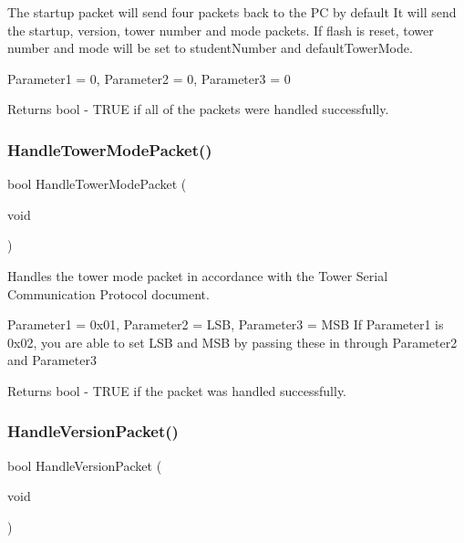 The startup packet will send four packets back to the PC by default It will send the startup, version, tower number and mode packets. If flash is reset, tower number and mode will be set to student\+Number and default\+Tower\+Mode. 

Parameter1 = 0, Parameter2 = 0, Parameter3 = 0

\begin{DoxyReturn}{Returns}
bool -\/ T\+R\+UE if all of the packets were handled successfully. 
\end{DoxyReturn}
\mbox{\label{group__main__module_gae491978a09b1e90673364b69746bcae1}} 
\subsubsection{\texorpdfstring{Handle\+Tower\+Mode\+Packet()}{HandleTowerModePacket()}}
{\footnotesize\ttfamily bool Handle\+Tower\+Mode\+Packet (\begin{DoxyParamCaption}\item[{void}]{ }\end{DoxyParamCaption})}



Handles the tower mode packet in accordance with the Tower Serial Communication Protocol document. 

Parameter1 = 0x01, Parameter2 = L\+SB, Parameter3 = M\+SB If Parameter1 is 0x02, you are able to set L\+SB and M\+SB by passing these in through Parameter2 and Parameter3

\begin{DoxyReturn}{Returns}
bool -\/ T\+R\+UE if the packet was handled successfully. 
\end{DoxyReturn}
\mbox{\label{group__main__module_ga84fe5ea768aedc0d1e4e2818ff8bd406}} 
\subsubsection{\texorpdfstring{Handle\+Version\+Packet()}{HandleVersionPacket()}}
{\footnotesize\ttfamily bool Handle\+Version\+Packet (\begin{DoxyParamCaption}\item[{void}]{ }\end{DoxyParamCaption})}



